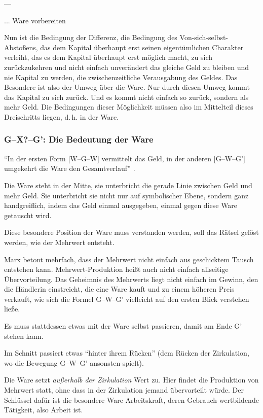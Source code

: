 \documentclass[12pt,
               DIV13,
               paper=a4,
               twoside=false,
               onehalfspacing,
               bibliography=totoc,
               toc=graduated,
               draft,
               ]{scrartcl}
\newcommand{\pc}[2]{\parencite[#1]{#2}}
\newcommand{\gwg}{G--W--G'\xspace}
\begin{document}
---

... Ware vorbereiten

Nun ist die Bedingung der Differenz, die Bedingung des
Von-sich-selbst-Abstoßens, das dem Kapital überhaupt erst seinen
eigentümlichen Charakter verleiht, das es dem Kapital überhaupt erst
möglich macht, zu sich zurückzukehren und nicht einfach unverändert
das gleiche Geld zu bleiben und nie Kapital zu werden, die
zwischenzeitliche Verausgabung des Geldes. Das Besondere ist also der
Umweg über die Ware. Nur durch diesen Umweg kommt das Kapital zu sich
zurück. Und es kommt nicht einfach so zurück, sondern als mehr Geld.
Die Bedingungen dieser Möglichkeit müssen also im Mittelteil dieses
Dreischritts liegen, d.\,h. in der Ware.


\subsubsection{G--X?--G': Die Bedeutung der Ware}

"`In der ersten Form [W--G--W] vermittelt das Geld, in der anderen
[G--W--G'] umgekehrt die Ware den Gesamtverlauf"' \pc{163}{kap}.

Die Ware steht in der Mitte, sie unterbricht die gerade Linie zwischen
Geld und mehr Geld. Sie unterbricht sie nicht nur auf symbolischer
Ebene, sondern ganz handgreiflich, indem das Geld einmal ausgegeben,
einmal gegen diese Ware getauscht wird.

Diese besondere Position der Ware muss verstanden werden, soll das
Rätsel gelöst werden, wie der Mehrwert entsteht.

Marx betont mehrfach, dass der Mehrwert nicht einfach aus geschicktem
Tausch entstehen kann. Mehrwert-Produktion heißt auch nicht einfach
allseitige Übervorteilung. Das Geheimnis des Mehrwerts liegt nicht
einfach im Gewinn, den die Händlerin einstreicht, die eine Ware kauft
und zu einem höheren Preis verkauft, wie sich die Formel \gwg
vielleicht auf den ersten Blick verstehen ließe.

Es muss stattdessen etwas mit der Ware selbst passieren, damit am Ende
G' stehen kann.

Im Schnitt passiert etwas "`hinter ihrem Rücken"' \pc{181}{kap} (dem
Rücken der Zirkulation, wo die Bewegung \gwg ansonsten spielt).

Die Ware setzt \emph{außerhalb der Zirkulation} Wert zu. Hier findet
die Produktion von Mehrwert statt, ohne dass in der Zirkulation jemand
übervorteilt würde. Der Schlüssel dafür ist die besondere Ware
Arbeitskraft, deren Gebrauch wertbildende Tätigkeit, also Arbeit ist.
\end{document}

